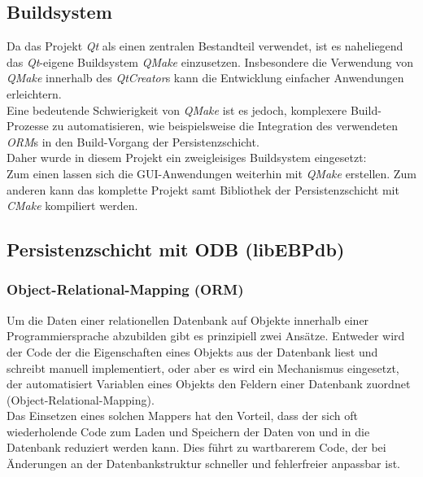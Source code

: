 \subsection{Buildsystem}
Da das Projekt \textit{Qt} als einen zentralen Bestandteil verwendet, ist es naheliegend das \textit{Qt}-eigene Buildsystem \textit{QMake} einzusetzen. Insbesondere die Verwendung von \textit{QMake} innerhalb des \textit{QtCreator}s kann die Entwicklung einfacher Anwendungen erleichtern.\\
Eine bedeutende Schwierigkeit von \textit{QMake} ist es jedoch, komplexere Build-Prozesse zu automatisieren, wie beispielsweise die Integration des verwendeten \textit{ORM}s in den Build-Vorgang der Persistenzschicht.\\
Daher wurde in diesem Projekt ein zweigleisiges Buildsystem eingesetzt:\\
Zum einen lassen sich die GUI-Anwendungen weiterhin mit \textit{QMake} erstellen. Zum anderen kann das komplette Projekt samt Bibliothek der Persistenzschicht mit \textit{CMake} kompiliert werden.\\
\newpage

\subsection{Persistenzschicht mit ODB (libEBPdb)}

\subsubsection{Object-Relational-Mapping (ORM)}
Um die Daten einer relationellen Datenbank auf Objekte innerhalb einer Programmiersprache abzubilden gibt es prinzipiell zwei Ansätze.
Entweder wird der Code der die Eigenschaften eines Objekts aus der Datenbank liest und schreibt manuell implementiert, oder aber es wird ein Mechanismus eingesetzt, der automatisiert Variablen eines Objekts den Feldern einer Datenbank zuordnet (Object-Relational-Mapping).\\
Das Einsetzen eines solchen Mappers hat den Vorteil, dass der sich oft wiederholende Code zum Laden und Speichern der Daten von und in die Datenbank reduziert werden kann. Dies führt zu wartbarerem Code, der bei Änderungen an der Datenbankstruktur schneller und fehlerfreier anpassbar ist.


